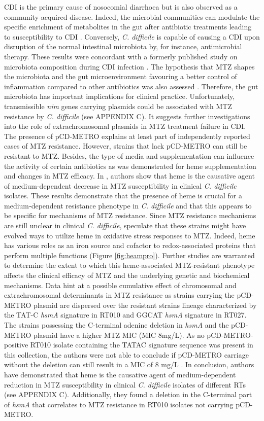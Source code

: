 \documentclass{article}
\begin{document}
CDI is the primary cause of nosocomial diarrhoea but is also observed as a community-acquired disease. Indeed, the microbial communities can modulate the specific enrichment of metabolites in the gut after antibiotic treatments leading to susceptibility to CDI \cite{Strati}. Conversely, {\it C. difficile} is capable of causing a CDI upon disruption of the normal intestinal microbiota by, for instance, antimicrobial therapy. These results were concordant with a formerly published study on microbiota composition during CDI infection \cite{Amrane}. The hypothesis that MTZ shapes the microbiota and the gut microenvironment favouring a better control of inflammation compared to other antibiotics was also assessed \cite{Strati}. Therefore, the gut microbiota has important implications for clinical practice. Unfortunately, transmissible {\it nim} genes carrying plasmids could be associated with MTZ resistance by {\it C. difficile} (see APPENDIX C). It suggests further investigations into the role of extrachromosomal plasmids in MTZ treatment failure in CDI. The presence of pCD-METRO explains at least part of independently reported cases of MTZ resistance. However, strains that lack pCD-METRO can still be resistant to MTZ. Besides, the type of media and supplementation can influence the activity of certain antibiotics as was demonstrated for heme supplementation and changes in MTZ efficacy. In \cite{Holgersen}, authors show that heme is the causative agent of medium‐dependent decrease in MTZ susceptibility in clinical {\it C. difficile} isolates. These results demonstrate that the presence of heme is crucial for a medium‐dependent resistance phenotype in {\it C. difficile} and that this appears to be specific for mechanisms of MTZ resistance. Since MTZ resistance mechanisms are still unclear in clinical {\it C. difficile}, \cite{Wu} speculate that these strains might have evolved ways to utilize heme in oxidative stress responses to MTZ. Indeed, heme has various roles as an iron source and cofactor to redox-associated proteins that perform multiple functions (Figure \ref{fig:heampro}). Further studies are warranted to determine the extent to which this heme-associated MTZ-resistant phenotype affects the clinical efficacy of MTZ and the underlying genetic and biochemical mechanisms. Data hint at a possible cumulative effect of chromosomal and extrachromosomal determinants in MTZ resistance as strains carrying the pCD-METRO plasmid are dispersed over the resistant strains lineage characterized by the TAT-C {\it hsmA} signature in RT010 and GGCAT {\it hsmA} signature in RT027. The strains possessing the C-terminal adenine deletion in {\it hsmA} and the pCD-METRO plasmid have a higher MTZ MIC (MIC 8mg/L). As no pCD-METRO-positive RT010 isolate containing the TATAC signature sequence was present in this collection, the authors were not able to conclude if pCD-METRO carriage without the deletion can still result in a MIC of 8 mg/L \cite{Boekhoud2}. In conclusion, authors have demonstrated that heme is the causative agent of medium-dependent reduction in MTZ susceptibility in clinical {\it C. difficile} isolates of different RTs (see APPENDIX C). Additionally, they found a deletion in the C-terminal part of {\it hsmA} that correlates to MTZ resistance in RT010 isolates not carrying pCD-METRO.
\end{document}

